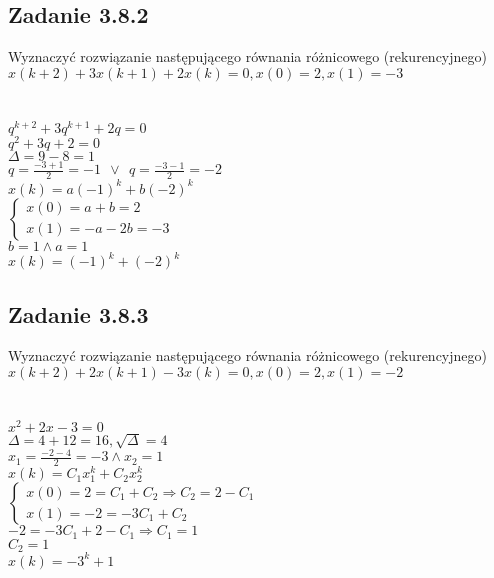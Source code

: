 \subsection*{Zadanie 3.8.2} {\color{darkgray}
	Wyznaczyć rozwiązanie następującego równania różnicowego (rekurencyjnego)\\
	$x(k+2)+3x(k+1)+2x(k)=0, x(0)=2,x(1)=-3$\\
}\lineh
\\\\
$q^{k+2}+3q^{k+1}+2q=0$\\
$q^2+3q+2=0$\\
$\Delta=9-8=1$\\
$q=\frac{-3+1}{2}=-1 \ \ \vee \ \ q=\frac{-3-1}{2}=-2$\\
$x(k)=a(-1)^k+b(-2)^k$\\
$\begin{cases} x(0)=a+b=2 \\ x(1)=-a-2b=-3\end{cases}$\\
$b=1 \wedge a=1$\\
$\boxed{x(k)=(-1)^k+(-2)^k}$

\pagebreak
\subsection*{Zadanie 3.8.3} {\color{darkgray}
	Wyznaczyć rozwiązanie następującego równania różnicowego (rekurencyjnego)\\
	$x(k+2)+2x(k+1)-3x(k)=0, x(0)=2,x(1)=-2$\\
}\lineh
\\\\
$x^2+2x-3=0$\\
$\Delta=4+12=16, \sqrt{\Delta}=4$\\
$x_1=\frac{-2-4}{2}=-3 \wedge x_2=1$\\
$x(k)=C_1x_1^k+C_2x_2^k$\\
$\begin{cases} x(0)=2=C_1+C_2 \Rightarrow C_2=2-C_1 \\ x(1)=-2=-3C_1+C_2\end{cases}$\\
$-2=-3C_1+2-C_1 \Rightarrow C_1=1$\\
$C_2=1$\\
$\boxed{x(k)=-3^k+1}$\\

